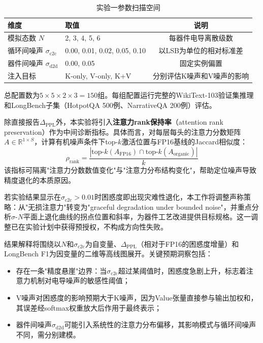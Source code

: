 \begin{table}[htbp]
\centering
\caption{实验一参数扫描空间}
\label{tab:exp1_grid}
\begin{tabular}{llc}
\toprule
维度 & 取值 & 说明 \\
\midrule
模拟态数 $N$ & 2, 3, 4, 5, 6 & 每器件电导离散级数 \\
循环间噪声 $\sigma_{\text{c2c}}$ & 0.00, 0.01, 0.02, 0.05, 0.10 & 以LSB为单位的相对标准差 \\
器件间噪声 $\sigma_{\text{d2d}}$ & 0.00, 0.05 & 固定实例偏置 \\
注入目标 & K-only, V-only, K+V & 分别评估K噪声和V噪声的影响 \\
\bottomrule
\end{tabular}
\end{table}

总配置数为$5 \times 5 \times 2 \times 3 = 150$组。每组配置运行完整的WikiText-103验证集推理和LongBench子集（HotpotQA 500例、NarrativeQA 200例）评估。

除直接报告$\Delta_{\text{PPL}}$外，本实验将引入\textbf{注意力rank保持率}（attention rank preservation）作为中间诊断指标。具体而言，对每层每头的注意力分数矩阵$A \in \mathbb{R}^{1 \times S}$，计算有机噪声条件下top-$k$激活位置与FP16基线的Jaccard相似度：
\begin{equation}
\rho_{\text{rank}} = \frac{|\text{top-}k(A_{\text{FP16}}) \cap \text{top-}k(A_{\text{organic}})|}{k}
\label{eq:rank_preservation}
\end{equation}
该指标可隔离"注意力分数数值变化"与"注意力分布结构变化"，帮助定位噪声导致精度退化的本质原因。

若实验结果显示在$\sigma_{\text{c2c}} > 0.01$时困惑度即出现灾难性退化，本工作将调整声称策略：从"无损注意力"转变为"graceful degradation under bounded noise"，并重点分析$\sigma$-$N$平面上退化曲线的拐点位置和斜率，为器件工艺改进提供目标规格。这一调整已在实验计划中获得预授权，不构成方向性失败。

结果解释将围绕以$N$和$\sigma_{\text{c2c}}$为自变量、$\Delta_{\text{PPL}}$（相对于FP16的困惑度增量）和LongBench F1为因变量的二维等高线图展开。关键预期洞察包括：

\begin{itemize}
    \item 存在一条"精度悬崖"边界：当$\sigma_{\text{c2c}}$超过某阈值时，困惑度急剧上升，标志着注意力机制对电导噪声的敏感性阈值；
    \item V噪声对困惑度的影响预期大于K噪声，因为Value张量直接参与输出加权和，其误差经softmax权重放大后作用于最终表示；
    \item 器件间噪声$\sigma_{\text{d2d}}$可能引入系统性的注意力分布偏移，其影响模式与循环间噪声不同，需分别建模。
\end{itemize}

